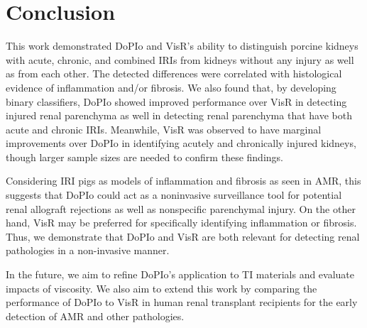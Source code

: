 \section{Conclusion}
This work demonstrated DoPIo and VisR's ability to distinguish porcine kidneys with acute, chronic, and combined IRIs from kidneys without any injury as well as from each other. The detected differences were correlated with histological evidence of inflammation and/or fibrosis. We also found that, by developing binary classifiers, DoPIo showed improved performance over VisR in detecting injured renal parenchyma as well in detecting renal parenchyma that have both acute and chronic IRIs. Meanwhile, VisR was observed to have marginal improvements over DoPIo in identifying acutely and chronically injured kidneys, though larger sample sizes are needed to confirm these findings. 

Considering IRI pigs as models of inflammation and fibrosis as seen in AMR, this suggests that DoPIo could act as a noninvasive surveillance tool for potential renal allograft rejections as well as nonspecific parenchymal injury. On the other hand, VisR may be preferred for specifically identifying inflammation or fibrosis. Thus, we demonstrate that DoPIo and VisR are both relevant for detecting renal pathologies in a non-invasive manner.

In the future, we aim to refine DoPIo's application to TI materials and evaluate impacts of viscosity. We also aim to extend this work by comparing the performance of DoPIo to VisR in human renal transplant recipients for the early detection of AMR and other pathologies.
